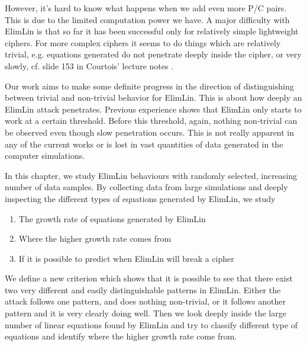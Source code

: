  
However, it's hard to know what happens when we add even more P/C pairs. This is due to the limited computation power we have. A major difficulty with ElimLin is that so far it has been successful only for relatively simple lightweight ciphers.
For more complex ciphers
it seems to do things which are relatively trivial,
e.g. equations generated do not penetrate deeply inside the cipher, or very slowly,
cf. %
slide 153 in Courtois' lecture notes \cite{SlidesAlgAllteach}.

Our work aims to make some definite progress in the direction of distinguishing between trivial and non-trivial behavior for ElimLin. This is about how deeply an ElimLin attack penetrates. Previous experience shows that ElimLin only starts to work at a certain threshold. Before this threshold, again, nothing non-trivial can be observed even though slow penetration occurs. This is not really apparent in any of the current works or is lost in vast quantities of data generated in the computer simulations. 

 In this chapter, we study ElimLin behaviours with randomly selected, increasing number of data samples. By collecting data from large simulations and deeply inspecting the different types of equations generated by ElimLin, we study
 
 \begin{enumerate}
 	\item The growth rate of equations generated by ElimLin
 	\item Where the higher growth rate comes from
 	\item If it is possible to predict when ElimLin will break a cipher
 \end{enumerate}
 
We define a new criterion which shows that it is possible to see that there exist two very different and easily distinguishable patterns in ElimLin. Either the attack follows one pattern, and does nothing non-trivial, or it follows another pattern and it is very clearly doing well. Then we look deeply inside the large number of linear equations found by ElimLin and try to classify different type of equations and identify where the higher growth rate come from.

